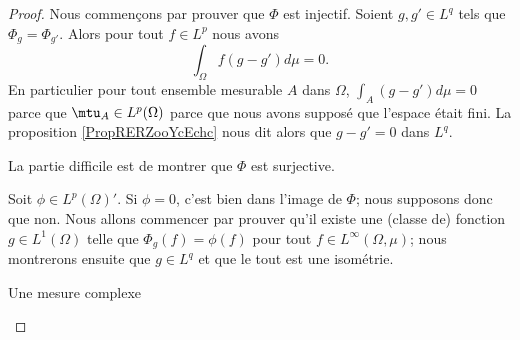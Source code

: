 \begin{proof}
    Nous commençons par prouver que \( \Phi\) est injectif. Soient \( g,g'\in L^q\) tels que \( \Phi_g=\Phi_{g'}\). Alors pour tout \( f\in L^p\) nous avons
            \begin{equation}
                \int_{\Omega}f(g-g')d\mu=0.
            \end{equation}
            En particulier pour tout ensemble mesurable \( A\) dans \( \Omega\), \( \int_A(g-g')d\mu=0\) parce que \( \mtu_A \in L^p(\Omega)\) parce que nous avons supposé que l'espace était fini. La proposition \ref{PropRERZooYcEchc} nous dit alors que \( g-g'=0\) dans \( L^q\).

    La partie difficile est de montrer que \( \Phi\) est surjective.


    Soit \( \phi\in L^p(\Omega)'\). Si \( \phi=0\), c'est bien dans l'image de \( \Phi\); nous supposons donc que non. Nous allons commencer par prouver qu'il existe une (classe de) fonction \( g\in L^1(\Omega)\) telle que \( \Phi_g(f)=\phi(f)\) pour tout \(f\in L^{\infty}(\Omega,\mu)\); nous montrerons ensuite que \( g\in L^q\) et que le tout est une isométrie.

    \begin{subproof}
        \item[Une mesure complexe]


\end{subproof}
\end{proof}
